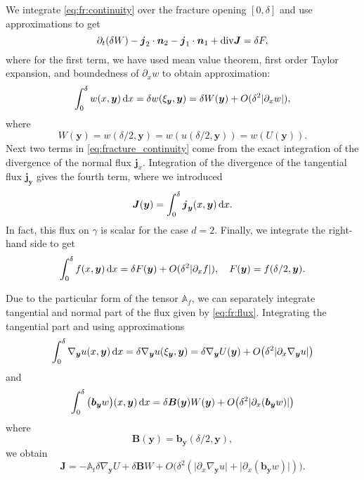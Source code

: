 \documentclass[12pt,a4paper]{report}
\def\prtl{\partial}
\def\vc#1{\mathbf{\boldsymbol{#1}}}     %
\def\tn#1{{\mathbb{#1}}}    %
\def\abs#1{\lvert#1\rvert}
\def\div{{\rm div}}
\def\grad{\nabla}
\def\d {\,{\rm d}}
\begin{document}
We integrate \eqref{eq:fr:continuity} over the fracture opening $[0,\delta]$ and use approximations to get
\begin{equation}
    \label{eq:fracture_continuity}
   \prtl_t (\delta W) - \vc j_2 \cdot \vc n_2 - \vc j_1 \cdot \vc n_1 + \div \vc J = \delta F,
\end{equation}
where for the first term, we have used mean value theorem, first order Taylor expansion, 
and boundedness of $\prtl_x w$ to obtain approximation:
\[
    \int_0^\delta w(x,\vc y) \d x=\delta w(\xi_{\vc y}, \vc y) = \delta W(\vc y) + O(\delta^2\abs{\prtl_x w}),
\]
where
\[
    W(\vc y)=w(\delta / 2,\vc y)=w(u(\delta/2,\vc y))=w(U(\vc y)).
\]
Next two terms in \eqref{eq:fracture_continuity} come from the exact integration 
of the divergence of the normal flux $\vc j_x$.
Integration of the divergence of the tangential flux $\vc j_{\vc y}$ gives the fourth term, where we introduced
\[
\vc J(\vc y) = \int_0^\delta \vc j_{\vc y}(x, \vc y) \d x.
\]
In fact, this flux on $\gamma$ is scalar for the case $d=2$. Finally, we integrate the right-hand side to get 
\[
    \int_0^\delta f(x,\vc y) \d x = \delta F(\vc y) + O(\delta^2\abs{\prtl_x f}),\quad F(\vc y)=f(\delta/2,\vc y). 
\]


Due to the particular form of the tensor $\tn A_f$, we can separately integrate tangential and normal
part of the flux given by \eqref{eq:fr:flux}. Integrating the tangential part and using approximations
\[
    \int_0^\delta  \grad_{\vc y} u(x, \vc y) \d x = \delta \grad_{\vc y} u (\xi_{\vc y}, \vc y) 
    = \delta \grad_{\vc y} U( \vc y) + O\big( \delta^2 \abs{\prtl_x\grad_{\vc y} u} \big) 
\]
and
\[
 \int_0^\delta \big(\vc b_{\vc y} w\big)(x, \vc y) \d x 
  = \delta \vc B(\vc y) W(\vc y) + O\big(\delta^2 \abs{\prtl_x(\vc b_{\vc y} w)} \big)
\]
where
\[
  \vc B(\vc y) = \vc b_{\vc y}(\delta/2, \vc y),
\]
we obtain
\begin{equation}
    \label{eq:fracture_darcy}
   \vc J = -\tn A_t \delta \grad_{\vc y} U + \delta \vc B W + O\big(\delta^2(\abs{\prtl_x\grad_{\vc y} u}+\abs{\prtl_x(\vc b_{\vc y} w)})\big).
\end{equation}
\end{document}

